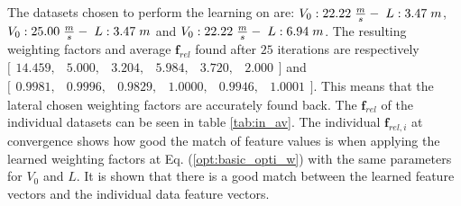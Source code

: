 
The datasets chosen to perform the learning on are: $V_0:22.22\hspace{1mm}\frac{m}{s}-\hspace{1mm} L:3.47\hspace{1mm}m$, $V_0:25.00\hspace{1mm}\frac{m}{s}-\hspace{1mm} L:3.47\hspace{1mm}m$ and $V_0:22.22\hspace{1mm}\frac{m}{s}-\hspace{1mm} L:6.94\hspace{1mm}m$. The resulting weighting factors and average $\bm{f}_{rel}$ found after $25$ iterations are respectively $\bigl[ \begin{smallmatrix} 14.459,&5.000,&3.204,&5.984,&3.720,&2.000\end{smallmatrix}\bigr]$ and $\bigl[ \begin{smallmatrix} 0.9981,&0.9996,&0.9829,&1.0000,&0.9946,&1.0001\end{smallmatrix}\bigr]$. This means that the lateral chosen weighting factors are accurately found back. The $\bm{f}_{rel}$ of the individual datasets can be seen in table \ref{tab:in_av}.  The individual $\bm{f}_{rel,i}$ at convergence shows how good the match of feature values is when applying the learned weighting factors at Eq. (\ref{opt:basic_opti_w}) with the same parameters for $V_0$ and $L$. It is shown that there is a good match between the learned feature vectors and the individual data feature vectors.
 
